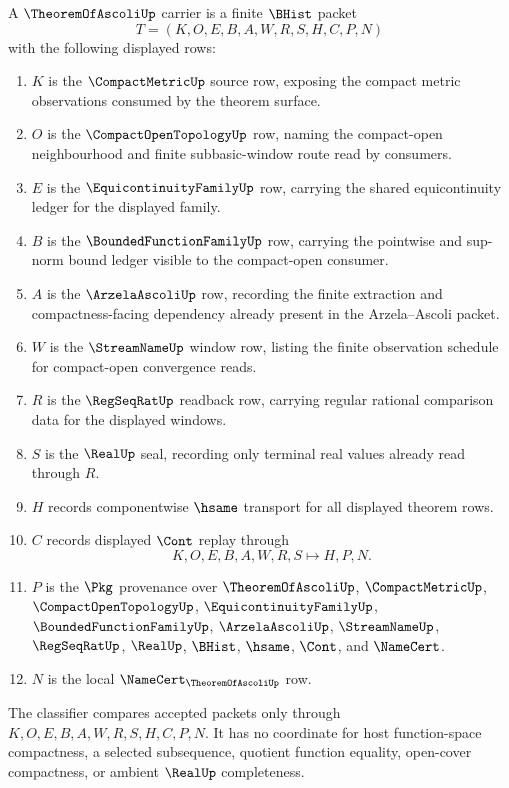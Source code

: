 \begin{definition}
\label{def:theorem-of-ascoli-carrier}
A $\TheoremOfAscoliUp$ carrier is a finite $\BHist$ packet
$$
T=(K,O,E,B,A,W,R,S,H,C,P,N)
$$
with the following displayed rows:
\begin{enumerate}
\item $K$ is the $\CompactMetricUp$ source row, exposing the compact metric observations consumed by the theorem surface.
\item $O$ is the $\CompactOpenTopologyUp$ row, naming the compact-open neighbourhood and finite subbasic-window route read by consumers.
\item $E$ is the $\EquicontinuityFamilyUp$ row, carrying the shared equicontinuity ledger for the displayed family.
\item $B$ is the $\BoundedFunctionFamilyUp$ row, carrying the pointwise and sup-norm bound ledger visible to the compact-open consumer.
\item $A$ is the $\ArzelaAscoliUp$ row, recording the finite extraction and compactness-facing dependency already present in the Arzela--Ascoli packet.
\item $W$ is the $\StreamNameUp$ window row, listing the finite observation schedule for compact-open convergence reads.
\item $R$ is the $\RegSeqRatUp$ readback row, carrying regular rational comparison data for the displayed windows.
\item $S$ is the $\RealUp$ seal, recording only terminal real values already read through $R$.
\item $H$ records componentwise $\hsame$ transport for all displayed theorem rows.
\item $C$ records displayed $\Cont$ replay through
$$
K,O,E,B,A,W,R,S \longmapsto H,P,N .
$$
\item $P$ is the $\Pkg$ provenance over $\TheoremOfAscoliUp$, $\CompactMetricUp$, $\CompactOpenTopologyUp$, $\EquicontinuityFamilyUp$, $\BoundedFunctionFamilyUp$, $\ArzelaAscoliUp$, $\StreamNameUp$, $\RegSeqRatUp$, $\RealUp$, $\BHist$, $\hsame$, $\Cont$, and $\NameCert$.
\item $N$ is the local $\NameCert_{\TheoremOfAscoliUp}$ row.
\end{enumerate}
The classifier compares accepted packets only through $K,O,E,B,A,W,R,S,H,C,P,N$. It has no coordinate for host function-space compactness, a selected subsequence, quotient function equality, open-cover compactness, or ambient $\RealUp$ completeness.
\end{definition}

